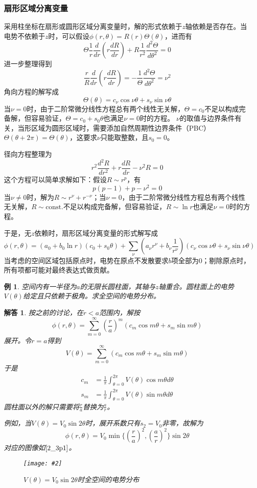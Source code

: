 \documentclass[a4paper,11pt]{ctexart}
\newcommand{\cpic}[2]{
\begin{center}
\texttt{[image: \#2]}
\end{center}
}
\newcommand{\cpicn}[3]
{
\begin{figure}[H]
\cpic{#1}{#2}
\caption{#3\label{#2}}
\end{figure}
}
\newtheorem{eg}{例}[section]
\newtheorem{ans}{解答}[section]
\newcommand{\beq}{\begin{equation}}
\newcommand{\eeq}{\end{equation}}
\newcommand{\bea}{\begin{equation}\begin{aligned}}
\newcommand{\eea}{\end{aligned}\end{equation}}
\begin{document}
\subsubsection{扇形区域分离变量}
采用柱坐标在扇形或圆形区域分离变量时，解的形式依赖于$z$轴依赖是否存在。当电势不依赖于$z$时，可以假设$\phi(r,\theta) = R(r) \Theta(\theta)$，进而有
\beq
\Theta \frac{1}{r} \frac{d}{dr} \left( r \frac{dR}{dr}\right) + R \frac{1}{r^2} \frac{d^2 \Theta}{d \theta^2} = 0
\eeq
进一步整理得到
\beq
\frac{r}{R} \frac{d}{dr} \left( r \frac{dR}{dr} \right) = - \frac{1}{\Theta} \frac{d^2 \Theta}{d \theta^2} = \nu^2
\eeq
角向方程的解写成
\beq
\Theta(\theta) = c_\nu \cos \nu \theta + s_\nu \sin \nu \theta
\eeq
当$\nu=0$时，由于二阶常微分线性方程总有两个线性无关解，$\Theta = c_0$不足以构成完备解，但容易验证，$\Theta = c_0 + s_0 \theta$也满足$\nu=0$时的方程。
$\nu$的取值与边界条件有关，当形区域为圆形区域时，需要添加自然周期性边界条件（PBC）$\Theta(\theta + 2\pi) = \Theta(\theta)$，这要求$\nu$只能取整数，且$s_0=0$。
\par
径向方程整理为
\beq
r^2 \frac{d^2 R}{dr^2} + r \frac{dR}{dr} - \nu^2 R = 0
\eeq
这个方程可以简单求解如下：假设$R \sim r^p$，有
\beq
p(p-1) + p - \nu^2 = 0
\eeq
当$\nu \not= 0$时，解为$R \sim r^\nu + r^{-\nu}$；当$\nu=0$，由于二阶常微分线性方程总有两个线性无关解，$R \sim \mathrm{const.}$不足以构成完备解，但容易验证，$R \sim \ln r$也满足$\nu=0$时的方程。
\par
于是，无$z$依赖时，扇形区域分离变量的形式解写成
\beq
\phi(r,\theta) = (a_0 + b_0 \ln r)(c_0 + s_0 \theta) + \sum_{\nu} \left(a_\nu r^\nu + b_\nu \frac{1}{r^\nu} \right) \left( c_\nu \cos \nu \theta + s_\nu \sin \nu \theta \right)
\eeq
当考虑的空间区域包括原点时，电势在原点不发散要求$b$项全部为0；剔除原点时，所有项都可能对最终表达式做贡献。
\begin{eg}
空间内有一半径为$a$的无限长圆柱面，其轴与$z$轴重合。圆柱面上的电势$V(\theta)$给定且只依赖于极角。求全空间的电势分布。
\end{eg}
\begin{ans}
按之前的讨论，在$r<a$范围内，解按
\beq
\phi(r,\theta) = \sum_{m=0}^\infty \left( \frac{r}{a} \right)^m \left( c_m \cos m \theta + s_m \sin m \theta \right)
\eeq
展开。令$r=a$得到
\beq
V(\theta) = \sum_{m=0}^\infty  \left( c_m \cos m \theta + s_m \sin m \theta \right)
\eeq
于是
\bea
c_m &= \frac{1}{\pi} \int_{\theta=0}^{2\pi} V(\theta) \cos m \theta d\theta \\
s_m &= \frac{1}{\pi} \int_{\theta=0}^{2\pi} V(\theta) \sin m \theta d\theta
\eea
圆柱面以外的解只需要将$\frac{r}{a}$替换为$\frac{a}{r}$。
\par
例如，当$V(\theta) = V_0 \sin 2\theta$时，展开系数只有$s_2 = V_0$非零，故解为
\beq
\phi(r,\theta) = V_0 \min \{ \left( \frac{r}{a}\right)^2 ,\left( \frac{a}{r} \right)^2\}  \sin 2\theta
\eeq
对应的图像如$\cref{2_3p1}$。
\cpicn{0.12}{2_3p1}{$V(\theta) = V_0 \sin 2\theta$时全空间的电势分布}
\end{ans}
\end{document}
